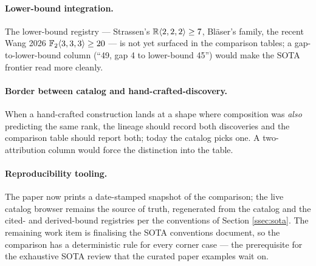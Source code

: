 \paragraph{Lower-bound integration.} The lower-bound registry ---
Strassen's \(\mathbb{R}\langle 2, 2, 2 \rangle \ge 7\), Bl\"aser's family, the
recent Wang 2026 \(\mathbb{F}_2\langle 3, 3, 3 \rangle \ge 20\) --- is not yet
surfaced in the comparison tables; a gap-to-lower-bound column (``49,
gap 4 to lower-bound 45'') would make the SOTA frontier read more
cleanly.

\paragraph{Border between catalog and hand-crafted-discovery.} When a
hand-crafted construction lands at a shape where composition was
\emph{also} predicting the same rank, the lineage should record both
discoveries and the comparison table should report both; today the
catalog picks one. A two-attribution column would force the
distinction into the table.

\paragraph{Reproducibility tooling.} The paper now prints a
date-stamped snapshot of the comparison; the live catalog browser
remains the source of truth, regenerated from the catalog and the
cited- and derived-bound registries per the conventions of Section
\ref{ssec:sota}. The remaining work item is finalising the SOTA
conventions document, so the comparison has a deterministic rule for
every corner case --- the prerequisite for the exhaustive SOTA review
that the curated paper examples wait on.
